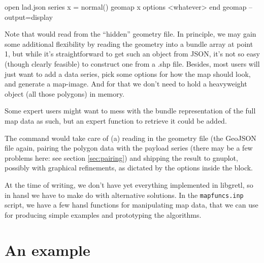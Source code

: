 \documentclass[a4paper]{article}
\begin{document}
\begin{scode}
  open lad.json 
  series x = normal() 
  geomap x 
     options <whatever> 
  end geomap --output=display
\end{scode}

Note that  would read from the ``hidden'' geometry
file. In principle, we may gain some additional flexibility by reading
the geometry into a bundle array at point 1, but while it's
straightforward to get such an object from JSON, it's not so easy
(though clearly feasible) to construct one from a .shp file. Besides,
most users will just want to add a data series, pick some options for
how the map should look, and generate a map-image.  And for that we
don't need to hold a heavyweight object (all those polygons) in
memory.

Some expert users might want to mess with the bundle
representation of the full map data as such, but an expert function to
retrieve it could be added.

The  command would take care of (a) reading in the
geometry file (the GeoJSON file again, pairing the polygon data with
the payload series (there may be a few problems here: see section
\ref{sec:pairing}) and shipping the result to gnuplot, possibly with
graphical refinements, as dictated by the options inside the block.

At the time of writing, we don't have yet everything implemented in
libgretl, so in hansl we have to make do with alternative
solutions. In the \texttt{mapfuncs.inp} script, we have a few hansl
functions for manipulating map data, that we can use for producing
simple examples and prototyping the algorithms.

\section{An example}
\label{sec:example}
\end{document}
